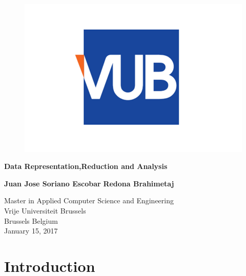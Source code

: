 \documentclass{article}
\begin{document}
    \begin{titlepage}
        \begin{center}
            \vspace*{1cm}
            \begin{figure}
                \centering
                \includegraphics[width=0.5\linewidth]{./img/vub.png}
            \end{figure}
            \Huge
            \textbf{Data Representation,Reduction and Analysis}
            
           
            
            \vspace{1.5cm}

            \textbf {\centering Juan Jose Soriano Escobar}
            \vspace{0.5cm}
            \newline
            \textbf{\centering Redona Brahimetaj}
            \vspace{0.5cm}
            \vfill
            
            
            \Large
            Master in Applied Computer Science and Engineering\\
            Vrije Universiteit Brussels\\
            Brussels Belgium\\
            January 15, 2017
            
        \end{center}
    \end{titlepage}

    \newpage

    \begin{appendix}
        \listoffigures
      \end{appendix}
      \newpage


        \section{Introduction}
   
         
        \newpage         
\end{document}

